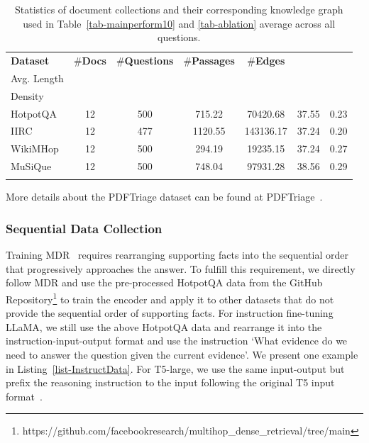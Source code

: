 \begin{table}[htbp!]
\vspace{-2ex}
\scriptsize
\setlength\tabcolsep{2pt}
\caption{Statistics of document collections and their corresponding knowledge graph used in Table~\ref{tab-mainperform10} and \ref{tab-ablation} average across all questions.}
\centering
\begin{center}
\begin{tabular}{lcccccc}
\Xhline{2\arrayrulewidth}
\textbf{Dataset} & \#\textbf{Docs} & \#\textbf{Questions} & \#\textbf{Passages} & \#\textbf{Edges}& \textbf{\makecell{Passage \\Avg. Length}} & \textbf{\makecell{KG \\Density}} \\
\Xhline{2\arrayrulewidth}
HotpotQA & 12 & 500 & 715.22 & 70420.68 & 37.55 & 0.23\\
IIRC & 12 & 477 & 1120.55 & 143136.17 & 37.24 & 0.20\\
WikiMHop & 12  & 500 & 294.19 & 19235.15 & 37.24 & 0.27 \\
MuSiQue & 12 & 500 & 748.04 & 97931.28 & 38.56 & 0.29 \\
\Xhline{2\arrayrulewidth}
\end{tabular}
\end{center}
\label{tab-dataset}
\vspace{-2ex}
\end{table}

More details about the PDFTriage dataset can be found at PDFTriage~\cite{saad2023pdftriage}.




\subsubsection{Sequential Data Collection} Training MDR~\cite{xiong2020answering} requires rearranging supporting facts into the sequential order that progressively approaches the answer. To fulfill this requirement, we directly follow MDR and use the pre-processed HotpotQA data from the GitHub Repository\footnote{https://github.com/facebookresearch/multihop\_dense\_retrieval/tree/main} to train the encoder and apply it to other datasets that do not provide the sequential order of supporting facts. For instruction fine-tuning LLaMA, we still use the above HotpotQA data and rearrange it into the instruction-input-output format and use the instruction `What evidence do we need to answer the question given the current evidence'. We present one example in Listing~\ref{list-InstructData}. For T5-large, we use the same input-output but prefix the reasoning instruction to the input following the original T5 input format~\cite{raffel2020exploring}.



